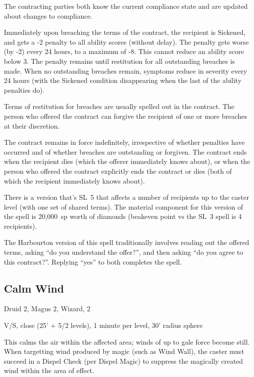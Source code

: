 The contracting parties both know the current compliance state and are
updated about changes to compliance.

Immediately upon breaching the terms of the contract, the recipient is
Sickened, and gets a -2 penalty to all ability scores (without delay).
The penalty gets worse (by -2) every 24 hours, to a maximum of -8. This
cannot reduce an ability score below 3. The penalty remains until
restitution for all outstanding breaches is made. When no outstanding
breaches remain, symptoms reduce in severity every 24 hours (with the
Sickened condition disappearing when the last of the ability penalties do).

Terms of restitution for breaches are usually spelled out in the contract.
The person who offered the contract can forgive the recipient of one or
more breaches at their discretion.

The contract remains in force indefinitely, irrespective of whether
penalties have occurred and of whether breaches are outstanding or forgiven.
The contract ends when the recipient dies (which the offerer immediately
knows about), or when the person who offered the contract explicitly ends
the contract or dies (both of which the recipient immediately knows about).

There is a version that's SL~5 that affects a number of recipients up to
the caster level (with one set of shared terms). The material component for
this version of the spell is \mbox{20,000~sp} worth of diamonds (beakeven
point vs the SL~3 spell is 4 recipients).

The Harbourton version of this spell traditionally involves reading out the
offered terms, asking ``do you understand the offer?'', and then asking
``do you agree to this contract?''. Replying ``yes'' to both completes the
spell.
%

%
\subsection{Calm Wind}

Druid 2, Magus 2, Wizard, 2

V/S, close (25' + 5/2 levels), 1 minute per level, 30' radius sphere

This calms the air within the affected area; winds of up to gale force become
still. When targetting wind produced by magic (such as Wind Wall), the
caster must succeed in a Dispel Check (per Dispel Magic) to suppress the
magically created wind within the area of effect.
%

